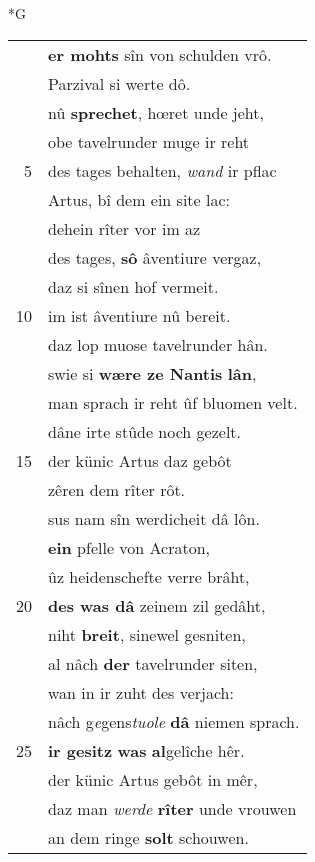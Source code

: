 \documentclass[8pt,a4paper,notitlepage]{article}
\begin{document}
\newpage
\begin{table}[ht]
\begin{minipage}[t]{0.5\linewidth}
\small
\begin{center}*G
\end{center}
\begin{tabular}{rl}
 & \textbf{er mohts} sîn von schulden vrô.\\ 
 & Parzival si werte dô.\\ 
 & nû \textbf{sprechet}, hœret unde jeht,\\ 
 & obe tavelrunder muge ir reht\\ 
5 & des tages behalten, \textit{wand} ir pflac\\ 
 & Artus, bî dem ein site lac:\\ 
 & dehein rîter vor im az\\ 
 & des tages, \textbf{sô} âventiure vergaz,\\ 
 & daz si sînen hof vermeit.\\ 
10 & im ist âventiure nû bereit.\\ 
 & daz lop muose tavelrunder hân.\\ 
 & swie si \textbf{wære ze Nantis} \textbf{lân},\\ 
 & man sprach ir reht ûf bluomen velt.\\ 
 & dâne irte stûde noch gezelt.\\ 
15 & der künic Artus daz gebôt\\ 
 & zêren dem rîter rôt.\\ 
 & sus nam sîn werdicheit dâ lôn.\\ 
 & \textbf{ein} pfelle von Acraton,\\ 
 & ûz heidenschefte verre brâht,\\ 
20 & \textbf{des was dâ} zeinem zil gedâht,\\ 
 & niht \textbf{breit}, sinewel gesniten,\\ 
 & al nâch \textbf{der} tavelrunder siten,\\ 
 & wan in ir zuht des verjach:\\ 
 & nâch g\textit{e}gens\textit{tuole} \textbf{dâ} niemen sprach.\\ 
25 & \textbf{ir gesitz} \textbf{was} \textbf{al}gelîche hêr.\\ 
 & der künic Artus gebôt in mêr,\\ 
 & daz man \textit{werde} \textbf{rîter} unde vrouwen\\ 
 & an dem ringe \textbf{solt} schouwen.\\ 

\end{tabular}
\end{minipage}
\end{table}
\end{document}
